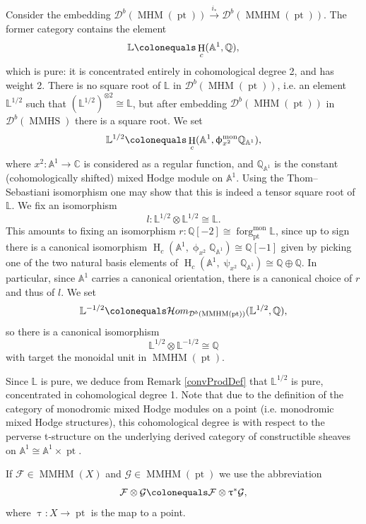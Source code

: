 \documentclass[a4paper,10pt]{amsart}
\renewcommand{\phi}{\upphi}
\renewcommand{\psi}{\uppsi}
\renewcommand{\tau}{\uptau}
\newcommand{\LL}{\mathbb{L}}
\newcommand{\phim}[1]{\phi^{\mon}_{#1}}
\DeclareMathOperator{\mon}{mon}
\DeclareMathOperator{\MMHM}{MMHM}
\DeclareMathOperator{\MMHS}{MMHS}
\DeclareMathOperator{\MHM}{MHM}
\DeclareMathOperator{\pt}{pt}
\DeclareMathOperator{\forg}{forg}
\newcommand{\form}[1]{\forg^{\mon}_{#1}}
\DeclareMathOperator{\HO}{H}
\newcommand{\Db}{\mathcal{D}^{b}}
\begin{document}
Consider the embedding $\Db(\MHM(\pt))\xrightarrow{i_*}\Db(\MMHM(\pt))$.  The former category contains the element
\[
\mathbb{L}\colonequals \HO_c(\mathbb{A}^1,\mathbb{Q}),
\]
which is pure: it is concentrated entirely in cohomological degree 2, and has weight 2.  There is no square root of $\mathbb{L}$ in $\Db(\MHM(\pt))$, i.e. an element $\mathbb{L}^{1/2}$ such that $(\mathbb{L}^{1/2})^{\otimes 2}\cong \mathbb{L}$, but after embedding $\Db(\MHM(\pt))$ in $\Db(\MMHS)$ there is a square root.  We set 
\[
\mathbb{L}^{1/2}\colonequals \HO_c(\mathbb{A}^1,\phim{x^2}\mathbb{Q}_{\mathbb{A}^1}), 
\]
where $x^2\colon \mathbb{A}^1\rightarrow\mathbb{C}$ is considered as a regular function, and $\mathbb{Q}_{\mathbb{A}^1}$ is the constant (cohomologically shifted) mixed Hodge module on $\mathbb{A}^1$.  Using the Thom--Sebastiani isomorphism one may show that this is indeed a tensor square root of $\LL$.  We fix an isomorphism 
\[
l\colon \mathbb{L}^{1/2}\otimes\mathbb{L}^{1/2}\cong\mathbb{L}.
\]
This amounts to fixing an isomorphism $r\colon\mathbb{Q}[-2]\cong\form{\pt}\LL$, since up to sign there is a canonical isomorphism $\HO_c(\mathbb{A}^1,\phi_{x^2}\mathbb{Q}_{\mathbb{A}^1})\cong \mathbb{Q}[-1]$ given by picking one of the two natural basis elements of $\HO_c(\mathbb{A}^1,\psi_{x^2}\mathbb{Q}_{\mathbb{A}^1})\cong\mathbb{Q}\oplus\mathbb{Q}$.  In particular, since $\mathbb{A}^1$ carries a canonical orientation, there is a canonical choice of $r$ and thus of $l$.  We set
\begin{equation}
\label{tensinv}
\mathbb{L}^{-1/2}\colonequals \mathcal{H}om_{\Db(\MMHM(\pt))}(\mathbb{L}^{1/2},\mathbb{Q}),
\end{equation}
so there is a canonical isomorphism
\[
\mathbb{L}^{1/2}\otimes\mathbb{L}^{-1/2}\cong\mathbb{Q}
\]
with target the monoidal unit in $\MMHM(\pt)$.
\smallbreak

Since $\LL$ is pure, we deduce from Remark \ref{convProdDef} that $\LL^{1/2}$ is pure, concentrated in cohomological degree 1.  Note that due to the definition of the category of monodromic mixed Hodge modules on a point (i.e. monodromic mixed Hodge structures), this cohomological degree is with respect to the perverse t-structure on the underlying derived category of constructible sheaves on $\mathbb{A}^1\cong\mathbb{A}^1\times \pt$.

If $\mathcal{F}\in\MMHM(X)$ and $\mathcal{G}\in\MMHM(\pt)$ we use the abbreviation
\[
\mathcal{F}\otimes\mathcal{G}\colonequals \mathcal{F}\otimes 
\tau^*\mathcal{G},
\]
where $\tau\colon X\rightarrow \pt$ is the map to a point.  
\end{document}
